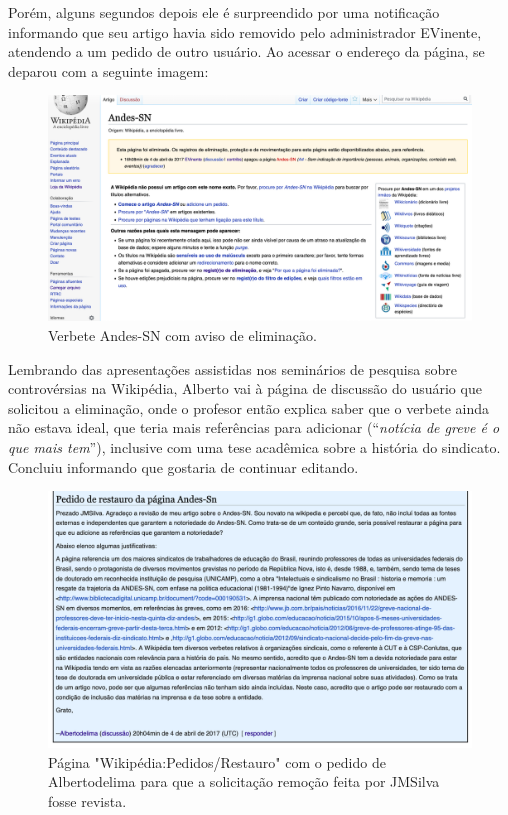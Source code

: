Porém, alguns segundos depois ele é surpreendido por uma notificação informando que seu artigo havia sido removido pelo administrador EVinente, atendendo a um pedido de outro usuário. Ao acessar o endereço da página, se deparou com a seguinte imagem:

\begin{figure}[H]
    \centering
    \includegraphics[width=1\textwidth]{Images/andes.png}
    \caption{Verbete Andes-SN com aviso de eliminação.}
    \label{fig:verbete_andes}
\end{figure}

Lembrando das apresentações assistidas nos seminários de pesquisa sobre controvérsias na Wikipédia, Alberto vai à página de discussão do usuário que solicitou a eliminação, onde o profesor então explica saber que o verbete ainda não estava ideal, que teria mais referências para adicionar (``\textit{notícia de greve é o que mais tem}''), inclusive com uma tese acadêmica sobre a história do sindicato. Concluiu informando que gostaria de continuar editando.

\begin{figure}[H]
    \centering
    \includegraphics[width=1\textwidth]{Images/alberto-pedido-restauro.png}
    \caption{Página "Wikipédia:Pedidos/Restauro" com o pedido de Albertodelima para que a solicitação remoção feita por JMSilva fosse revista.}
    \label{fig:pedido_restauro_andes}
\end{figure}


